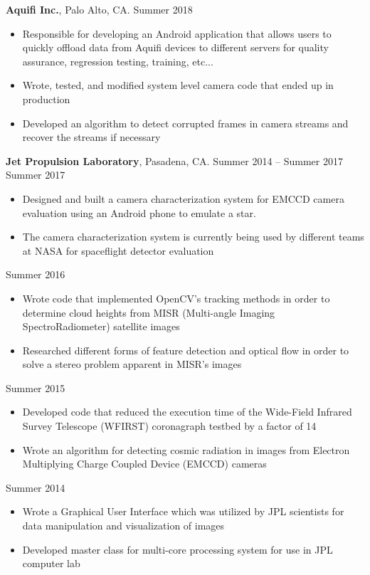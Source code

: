 \documentclass[mm,line]{res}
\newcommand\tab[1][1cm]{\hspace*{#1}}
\begin{document}
\begin{resume}
{\bf Aquifi Inc.}, Palo Alto, CA.  \hfill{Summer 2018}\\
\tab[4mm]{\em Software Architecture Intern}\hfill 
\begin{itemize} %
	\item 	Responsible for developing an Android application that allows users to quickly offload data from Aquifi devices to different servers for quality assurance, regression testing, training, etc...
	\item Wrote, tested, and modified system level camera code that ended up in production
	\item Developed an algorithm to detect corrupted frames in camera streams and recover the streams if necessary 
\end{itemize}
{\bf Jet Propulsion Laboratory}, Pasadena, CA. \hfill{Summer 2014 -- Summer 2017}\\
\tab[4mm]{\em Software and Hardware Testbed Development Intern}\hfill {Summer 2017}
\begin{itemize} %
\item 	Designed and built a camera characterization system for EMCCD camera evaluation using an Android phone to emulate a star.
\item 	The camera characterization system is currently being used by different teams at NASA for spaceflight detector evaluation 
\end{itemize}
\tab[4mm]{\em Computer Vision Intern}\hfill {Summer 2016}
\begin{itemize} %
\item  	Wrote code that implemented OpenCV's tracking methods in order to determine cloud heights from MISR (Multi-angle Imaging SpectroRadiometer) satellite images  
\item 	Researched different forms of feature detection and optical flow in order to solve a stereo problem apparent in MISR’s images 
\end{itemize}
\tab[4mm]{\em Software and Hardware Intern for Optical Systems}\hfill {Summer 2015}
\begin{itemize} %
\item 	Developed code that reduced the execution time of the Wide-Field Infrared Survey Telescope (WFIRST) coronagraph testbed by a factor of 14
\item 	Wrote an algorithm for detecting cosmic radiation in images from Electron Multiplying Charge Coupled Device (EMCCD) cameras 
\end{itemize}
\tab[4mm]{\em  Software Intern}\hfill {Summer 2014}
\begin{itemize} %
\item 	Wrote a Graphical User Interface which was utilized by JPL scientists for data manipulation and visualization of images 
\item 	Developed master class for multi-core processing system for use in JPL computer lab 
\end{itemize}



\end{resume}
\end{document}
